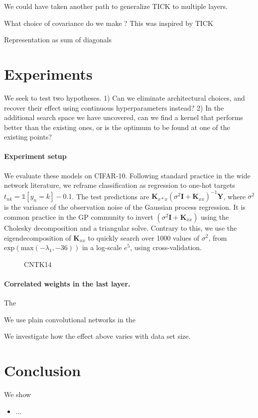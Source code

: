 \documentclass{article}
\theoremstyle{definition}
\newcommand{\adriacomment}[1]{\todo[color=blue]{#1}\xspace}
\newcommand{\vK}{\mathbf{K}}
\newcommand{\vY}{\mathbf{Y}}
\newcommand{\eye}{\mathbf{I}}
\newcommand{\bracket}[3]{{\left#1 #3 \right#2}}
\newcommand{\bra}{\bracket{(}{)}}
\newcommand{\indicator}[1]{{\mathds{1}}\left[#1\right]}
\begin{document}
We could have taken another path to generalize TICK to multiple layers.

What choice of covariance do we make ?
This was inspired by TICK

Representation as sum of diagonals

\section{Experiments}
We seek to test two hypotheses. 1) Can we eliminate architectural choices, and
recover their effect using continuous hyperparameters instead? 
2) In the additional search space we have uncovered, can we find a kernel that
performs better than the existing ones, or is the optimum to be found at one of
the existing points? \adriacomment{reword}

\paragraph{Experiment setup} We evaluate these models on CIFAR-10. Following
standard practice in the wide network literature, we reframe classification as
regression to one-hot targets $t_{nk} = \indicator{y_n = k} - 0.1$. The test
predictions are $\vK_{x*x}\bra{\sigma^2\eye + \vK_{xx}}^{-1}\vY$, where
$\sigma^2$ is the variance of the observation noise of the Gaussian process
regression. It is common practice in the GP community to invert
$\bra{\sigma^2\eye + \vK_{xx}}$ using the Cholesky decomposition and a
triangular solve. Contrary to this, we use the eigendecomposition of $\vK_{xx}$
to quickly search over 1000 values of $\sigma^2$, from
$\text{exp}\bra{\text{max}(-\lambda_1, -36)}$ in a log-scale $e^5$, using cross-validation.

\begin{figure}
    \scalebox{1.0}{}
  \caption{CNTK14}
\end{figure}



\paragraph{Correlated weights in the last layer.} The 


We use plain convolutional networks in the 

We investigate how the effect above varies with data set size.



\section{Conclusion}
We show
\begin{itemize}
    \item ...
\end{itemize}
\end{document}
